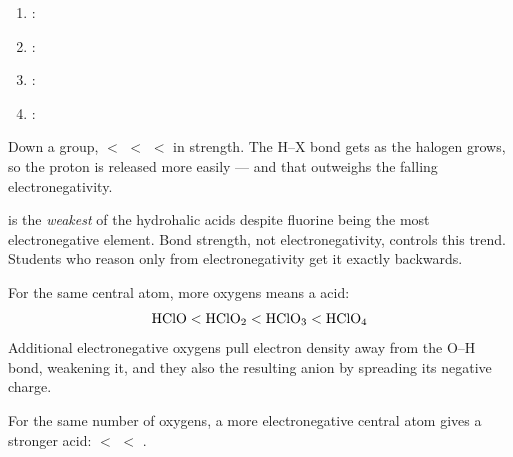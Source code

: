 \documentclass{apchem-notes}
\begin{document}

\begin{enumerate}[leftmargin=*,itemsep=0.3em]
  \item {}: 
  \item {}: 
  \item {}: 
  \item {}: 
\end{enumerate}




Down a group,  $<$  $<$  $<$  in strength.
The H--X bond gets  as the halogen grows, so the
proton is released more easily --- and that outweighs the falling
electronegativity.

\begin{apctrap}
 is the \emph{weakest} of the hydrohalic acids despite fluorine being
the most electronegative element. Bond strength, not electronegativity,
controls this trend. Students who reason only from electronegativity get it
exactly backwards.
\end{apctrap}


For the same central atom, more oxygens means a
 acid:
\[
  \ce{HClO} < \ce{HClO2} < \ce{HClO3} < \ce{HClO4}
\]
Additional electronegative oxygens pull electron density away from the O--H
bond, weakening it, and they also
 the resulting anion by spreading its negative
charge.

For the same number of oxygens, a more electronegative central atom gives a
stronger acid:  $<$  $<$ .

\end{document}
